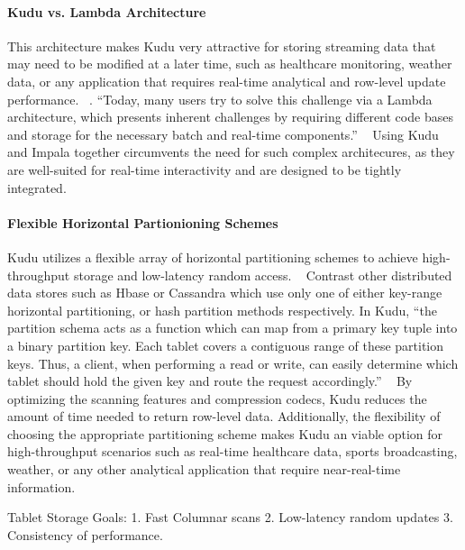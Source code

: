 \paragraph{Kudu vs. Lambda Architecture}
This architecture makes Kudu very attractive for storing streaming data that may need to be modified at a later time, such as healthcare monitoring, weather data, or any application that requires real-time analytical and row-level update performance. ~\cite{hid-sp18-407-kudu-schema-design}. ``Today, many users try to solve this challenge via a Lambda architecture, which presents inherent challenges by requiring different code bases and storage for the necessary batch and real-time components.'' ~\cite{hid-sp18-407-kudu-impala-integration} Using Kudu and Impala together circumvents the need for such complex architecures, as they are well-suited for real-time interactivity and are designed to be tightly integrated.
\paragraph{Flexible Horizontal Partionioning Schemes} Kudu utilizes a flexible array of horizontal partitioning schemes to achieve high-throughput storage and low-latency random access. ~\cite{hid-sp18-407-kudu-intro} Contrast other distributed data stores such as Hbase or Cassandra which use only one of either key-range horizontal partitioning, or hash partition methods respectively. In Kudu, ``the partition schema acts as a function which can map from a primary key tuple into a binary partition key. Each tablet covers a contiguous  range  of  these partition keys. Thus,  a client, when performing a read or write, can easily determine which tablet should hold the given key and route the request accordingly.'' ~\cite{hid-sp18-407-kudu-intro} By optimizing the scanning features and compression codecs, Kudu reduces the amount of time needed to return row-level data. Additionally, the flexibility of choosing the appropriate partitioning scheme makes Kudu an viable option for high-throughput scenarios such as real-time healthcare data, sports broadcasting, weather, or any other analytical application that require near-real-time information.
\begin{enumerate}
Tablet Storage Goals: 
1. Fast Columnar scans
2. Low-latency random updates
3. Consistency of performance.
\end{enumerate}
